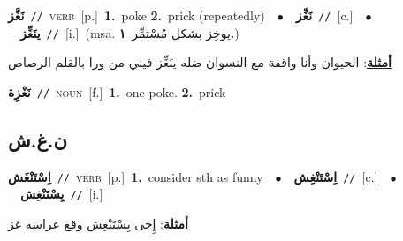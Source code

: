 \documentclass[10pt,a4paper,twoside]{article} %
\begin{document}
\begin{multicols}{2}
{\setlength\topsep{0pt}\textbf{\foreignlanguage{arabic}{نَغَّز}}\ {\color{gray}\texttt{//}\color{black}}\ \textsc{verb}\ [p.]\ \textbf{1.}~poke  \textbf{2.}~prick (repeatedly)\ \ $\bullet$\ \ \setlength\topsep{0pt}\textbf{\foreignlanguage{arabic}{نَغِّز}}\ {\color{gray}\texttt{//}\color{black}}\ [c.]\ \ $\bullet$\ \ \setlength\topsep{0pt}\textbf{\foreignlanguage{arabic}{ينَغِّز}}\ {\color{gray}\texttt{//}\color{black}}\ [i.]\ \color{gray}(msa. \foreignlanguage{arabic}{يوخِز بشكل مُسْتمِّر}~\foreignlanguage{arabic}{\textbf{١.}})\color{black}\  \begin{flushright}\color{gray}\foreignlanguage{arabic}{\textbf{\underline{\foreignlanguage{arabic}{أمثلة}}}: الحيوان وأنا واقفة مع النسوان ضله ينَغِّز فيني من ورا بالقلم الرصاص}\end{flushright}\color{black}} \vspace{2mm}

{\setlength\topsep{0pt}\textbf{\foreignlanguage{arabic}{نَغْزِة}}\ {\color{gray}\texttt{//}\color{black}}\ \textsc{noun}\ [f.]\ \textbf{1.}~one poke.  \textbf{2.}~prick\ } \vspace{2mm}

\vspace{-3mm}
\subsection*{\color{blue}\foreignlanguage{arabic}{ن.غ.ش}\color{blue}{}} 

{\setlength\topsep{0pt}\textbf{\foreignlanguage{arabic}{اِسْتَنْغَش}}\ {\color{gray}\texttt{//}\color{black}}\ \textsc{verb}\ [p.]\ \textbf{1.}~consider sth as funny\ \ $\bullet$\ \ \setlength\topsep{0pt}\textbf{\foreignlanguage{arabic}{اِسْتَنْغِش}}\ {\color{gray}\texttt{//}\color{black}}\ [c.]\ \ $\bullet$\ \ \setlength\topsep{0pt}\textbf{\foreignlanguage{arabic}{يِسْتَنْغِش}}\ {\color{gray}\texttt{//}\color{black}}\ [i.]\  \begin{flushright}\color{gray}\foreignlanguage{arabic}{\textbf{\underline{\foreignlanguage{arabic}{أمثلة}}}: إِجى يِسْتَنْغِش وقع عراسه غز}\end{flushright}\color{black}} \vspace{2mm}


\end{multicols}
\end{document}
